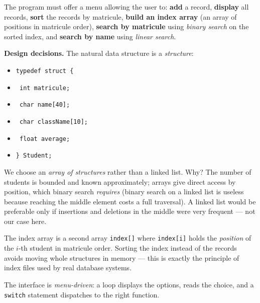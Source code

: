 \documentclass[11pt]{article}
\newcommand{\cle}[1]{{\popxbold\color{popdark}#1}}
\begin{document}
The program must offer a menu allowing the user to: \textbf{add} a record, \textbf{display} all records, \textbf{sort} the records by matricule, \textbf{build an index array} (an array of positions in matricule order), \textbf{search by matricule} using \emph{binary search} on the sorted index, and \textbf{search by name} using \emph{linear search}.

\textbf{Design decisions.} The natural data structure is a \emph{structure}:

\begin{itemize}
\item \texttt{typedef struct \{}
\item \texttt{    int matricule;}
\item \texttt{    char name[40];}
\item \texttt{    char className[10];}
\item \texttt{    float average;}
\item \texttt{\} Student;}
\end{itemize}

We choose an \emph{array of structures} rather than a linked list. Why? The number of students is bounded and known approximately; arrays give direct access by position, which binary search \emph{requires} (binary search on a linked list is useless because reaching the middle element costs a full traversal). A linked list would be preferable only if insertions and deletions in the middle were very frequent --- not our case here.

The \cle{index array} is a second array \texttt{index[]} where \texttt{index[i]} holds the \emph{position} of the $i$-th student in matricule order. Sorting the index instead of the records avoids moving whole structures in memory --- this is exactly the principle of index files used by real database systems.

The interface is \emph{menu-driven}: a loop displays the options, reads the choice, and a \texttt{switch} statement dispatches to the right function.
\end{document}
